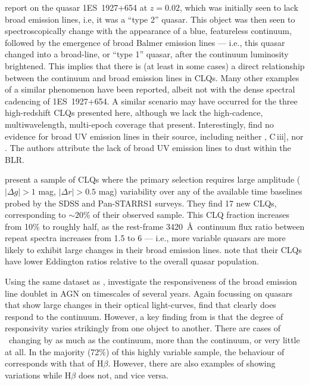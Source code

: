 \documentclass[fleqn,usenatbib]{mnras}
\begin{document}
\citet{Trakhtenbrot2019} report on the quasar 1ES~1927+654 at
$z=0.02$, which was initially seen to lack broad emission lines, i.e, it was a ``type 2'' quasar. This
object was then seen to spectroscopically change with the appearance
of a blue, featureless continuum, followed by the emergence of broad
Balmer emission lines --- i.e., this quasar changed into a broad-line,
or ``type 1'' quasar, after the continuum luminosity brightened.  This
implies that there is (at least in some cases) a direct relationship
between the continuum and broad emission lines in CLQs.  Many other
examples of a similar phenomenon have been reported, albeit not with
the dense spectral cadencing of 1ES~1927+654.  A similar scenario may
have occurred for the three high-redshift CLQs presented here,
although we lack the high-cadence, multiwavelength, multi-epoch
coverage that \citet{Trakhtenbrot2019} present.  Interestingly,
\citet{Trakhtenbrot2019} find no evidence for broad UV emission lines
in their source, including neither \civ, C\,{\sc iii}], nor \mgii.  The
authors attribute the lack of broad UV emission lines to dust within
the BLR.

\citet{MacLeod2019} present a sample of CLQs where the primary
selection requires large amplitude ($| \Delta g | > 1$ mag, $| \Delta
r | > 0.5$ mag) variability over any of the available time baselines
probed by the SDSS and Pan-STARRS1 surveys. They find 17 new CLQs,
corresponding to $\sim 20$\% of their observed sample. This CLQ
fraction increases from 10\% to roughly half, as the rest-frame
3420~\AA\ continuum flux ratio between repeat spectra increases from
1.5 to 6 --- i.e., more variable quasars are more likely to exhibit
large changes in their broad emission lines. \citet{MacLeod2019} note
that their CLQs have lower Eddington ratios relative to the overall
quasar population.

Using the same dataset as \citet{MacLeod2019}, \citet{Homan2020}
investigate the responsiveness of the \mgii broad emission line
doublet in AGN on timescales of several years.  Again focussing on
quasars that show large changes in their optical light-curves,
\citet{Homan2020} find that \mgii clearly does respond to the
continuum.  However, a key finding from \citet{Homan2020} is that the
degree of responsivity varies strikingly from one object to another.
There are cases of \mgii\ changing by as much as the continuum, more
than the continuum, or very little at all.  In the majority (72\%) of
this highly variable sample, the behaviour of \mgii corresponds with
that of H$\beta$.  However, there are also examples of \mgii showing
variations while H$\beta$ does not, and vice versa.
\end{document}
